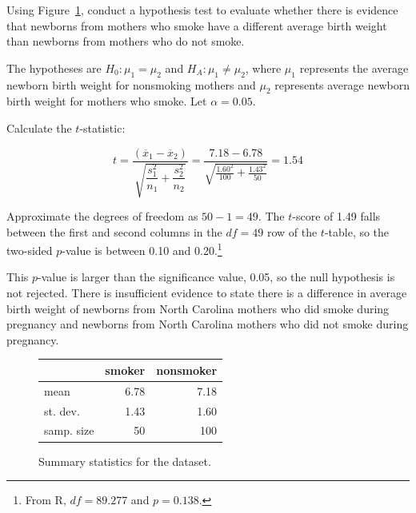 \begin{examplewrap}
\begin{nexample}{Using Figure~\ref{summaryStatsBabySmoke}, conduct a hypothesis test to evaluate whether there is evidence that newborns from mothers who smoke have a different average birth weight than newborns from mothers who do not smoke.}

The hypotheses are $H_0: \mu_{1} = \mu_{2}$ and $H_A: \mu_{1} \neq \mu_{2}$, where $\mu_{1}$ represents the average newborn birth weight for nonsmoking mothers and $\mu_{2}$ represents average newborn birth weight for mothers who smoke. Let $\alpha = 0.05$. 	

Calculate the $t$-statistic:

\[t = \dfrac{(\overline{x}_1 - \overline{x}_2)}{\sqrt{\dfrac{s_{1}^{2}}{n_1} + \dfrac{s_{2}^{2}}{n_2}}} = \dfrac{7.18 - 6.78}{\sqrt{\frac{1.60^2}{100} + \frac{1.43^2}{50}}} = 1.54\]

Approximate the degrees of freedom as $50 - 1 = 49$. The $t$-score of 1.49 falls between the first and second columns in the $df = 49$ row of the $t$-table, so the two-sided $p$-value is between 0.10 and 0.20.\footnote{From \textsf{R}, $df = 89.277$ and $p = 0.138$.}

This $p$-value is larger than the significance value, 0.05, so the null hypothesis is not rejected. There is insufficient evidence to state there is a difference in average birth weight of newborns from North Carolina mothers who did smoke during pregnancy and newborns from North Carolina mothers who did not smoke during pregnancy.
\end{nexample}
\end{examplewrap}

\begin{figure}[hhh]
	\centering
	\begin{tabular}{lrr}
		& smoker & nonsmoker \\
		\hline
		mean & 6.78 & 7.18 \\
		st. dev. & 1.43 & 1.60 \\
		samp. size & 50 & 100 \\
		\hline
	\end{tabular}
	\caption{Summary statistics for the  dataset.}
	\label{summaryStatsBabySmoke}
\end{figure}		




\textD{\newpage}


